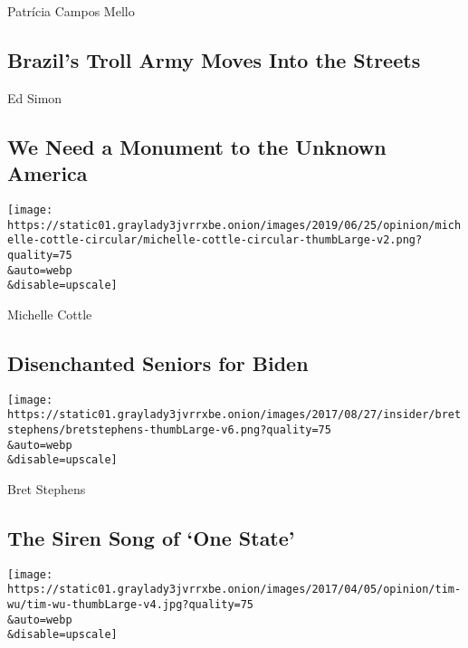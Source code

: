 \href{/2020/08/04/opinion/bolsonaro-office-of-hate-brazil.html}{}

Patrícia Campos Mello

\hypertarget{brazils-troll-army-moves-into-the-streets}{%
\subsection{Brazil's Troll Army Moves Into the
Streets}\label{brazils-troll-army-moves-into-the-streets}}

\href{/2020/08/04/opinion/us-monuments-rome-unknown-god.html}{}

Ed Simon

\hypertarget{we-need-a-monument-to-the-unknown-america}{%
\subsection{We Need a Monument to the Unknown
America}\label{we-need-a-monument-to-the-unknown-america}}

\href{/2020/08/03/opinion/senior-voters-biden-trump-2020.html}{}

\texttt{[image: https://static01.graylady3jvrrxbe.onion/images/2019/06/25/opinion/michelle-cottle-circular/michelle-cottle-circular-thumbLarge-v2.png?quality=75\\\&auto=webp\\\&disable=upscale]}

Michelle Cottle

\hypertarget{disenchanted-seniors-for-biden}{%
\subsection{Disenchanted Seniors for
Biden}\label{disenchanted-seniors-for-biden}}

\href{/2020/08/03/opinion/israel-palestine-one-state-solution.html}{}

\texttt{[image: https://static01.graylady3jvrrxbe.onion/images/2017/08/27/insider/bretstephens/bretstephens-thumbLarge-v6.png?quality=75\\\&auto=webp\\\&disable=upscale]}

Bret Stephens

\hypertarget{the-siren-song-of-one-state}{%
\subsection{The Siren Song of `One
State'}\label{the-siren-song-of-one-state}}

\href{/2020/08/04/opinion/amazon-facebook-congressional-hearings.html}{}

\texttt{[image: https://static01.graylady3jvrrxbe.onion/images/2017/04/05/opinion/tim-wu/tim-wu-thumbLarge-v4.jpg?quality=75\\\&auto=webp\\\&disable=upscale]}


